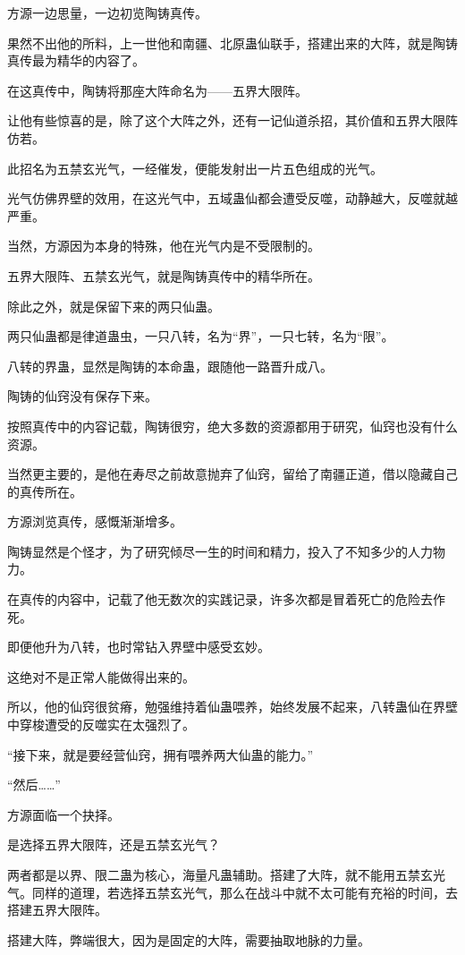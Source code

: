 \begin{this_body}
方源一边思量，一边初览陶铸真传。

果然不出他的所料，上一世他和南疆、北原蛊仙联手，搭建出来的大阵，就是陶铸真传最为精华的内容了。

在这真传中，陶铸将那座大阵命名为——五界大限阵。

让他有些惊喜的是，除了这个大阵之外，还有一记仙道杀招，其价值和五界大限阵仿若。

此招名为五禁玄光气，一经催发，便能发射出一片五色组成的光气。

光气仿佛界壁的效用，在这光气中，五域蛊仙都会遭受反噬，动静越大，反噬就越严重。

当然，方源因为本身的特殊，他在光气内是不受限制的。

五界大限阵、五禁玄光气，就是陶铸真传中的精华所在。

除此之外，就是保留下来的两只仙蛊。

两只仙蛊都是律道蛊虫，一只八转，名为“界”，一只七转，名为“限”。

八转的界蛊，显然是陶铸的本命蛊，跟随他一路晋升成八。

陶铸的仙窍没有保存下来。

按照真传中的内容记载，陶铸很穷，绝大多数的资源都用于研究，仙窍也没有什么资源。

当然更主要的，是他在寿尽之前故意抛弃了仙窍，留给了南疆正道，借以隐藏自己的真传所在。

方源浏览真传，感慨渐渐增多。

陶铸显然是个怪才，为了研究倾尽一生的时间和精力，投入了不知多少的人力物力。

在真传的内容中，记载了他无数次的实践记录，许多次都是冒着死亡的危险去作死。

即便他升为八转，也时常钻入界壁中感受玄妙。

这绝对不是正常人能做得出来的。

所以，他的仙窍很贫瘠，勉强维持着仙蛊喂养，始终发展不起来，八转蛊仙在界壁中穿梭遭受的反噬实在太强烈了。

“接下来，就是要经营仙窍，拥有喂养两大仙蛊的能力。”

“然后……”

方源面临一个抉择。

是选择五界大限阵，还是五禁玄光气？

两者都是以界、限二蛊为核心，海量凡蛊辅助。搭建了大阵，就不能用五禁玄光气。同样的道理，若选择五禁玄光气，那么在战斗中就不太可能有充裕的时间，去搭建五界大限阵。

搭建大阵，弊端很大，因为是固定的大阵，需要抽取地脉的力量。


\end{this_body}
